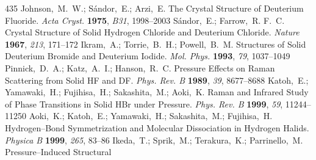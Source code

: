 \documentclass[12pt,letterpaper,oneside]{article}
\begin{document}
\begin{mcitethebibliography}{435}
\EndOfBibitem
{}
Johnson,~M.~W.; S{\'a}ndor,~E.; Arzi,~E. The Crystal Structure of Deuterium
  Fluoride. \emph{Acta Cryst.} \textbf{1975}, \emph{B31}, 1998--2003\relax
\mciteBstWouldAddEndPuncttrue
\mciteSetBstMidEndSepPunct{\mcitedefaultmidpunct}
{\mcitedefaultendpunct}{\mcitedefaultseppunct}\relax
\EndOfBibitem
{}
S{\'a}ndor,~E.; Farrow,~R. F.~C. Crystal Structure of Solid Hydrogen Chloride
  and Deuterium Chloride. \emph{Nature} \textbf{1967}, \emph{213},
  171--172\relax
\mciteBstWouldAddEndPuncttrue
\mciteSetBstMidEndSepPunct{\mcitedefaultmidpunct}
{\mcitedefaultendpunct}{\mcitedefaultseppunct}\relax
\EndOfBibitem
{}
Ikram,~A.; Torrie,~B.~H.; Powell,~B.~M. Structures of Solid Deuterium Bromide
  and Deuterium Iodide. \emph{Mol. Phys.} \textbf{1993}, \emph{79},
  1037--1049\relax
\mciteBstWouldAddEndPuncttrue
\mciteSetBstMidEndSepPunct{\mcitedefaultmidpunct}
{\mcitedefaultendpunct}{\mcitedefaultseppunct}\relax
\EndOfBibitem
{}
Pinnick,~D.~A.; Katz,~A.~I.; Hanson,~R.~C. Pressure Effects on Raman Scattering
  from Solid HF and DF. \emph{Phys. Rev. B} \textbf{1989}, \emph{39},
  8677--8688\relax
\mciteBstWouldAddEndPuncttrue
\mciteSetBstMidEndSepPunct{\mcitedefaultmidpunct}
{\mcitedefaultendpunct}{\mcitedefaultseppunct}\relax
\EndOfBibitem
{}
Katoh,~E.; Yamawaki,~H.; Fujihisa,~H.; Sakashita,~M.; Aoki,~K. Raman and
  Infrared Study of Phase Transitions in Solid HBr under Pressure. \emph{Phys.
  Rev. B} \textbf{1999}, \emph{59}, 11244--11250\relax
\mciteBstWouldAddEndPuncttrue
\mciteSetBstMidEndSepPunct{\mcitedefaultmidpunct}
{\mcitedefaultendpunct}{\mcitedefaultseppunct}\relax
\EndOfBibitem
{}
Aoki,~K.; Katoh,~E.; Yamawaki,~H.; Sakashita,~M.; Fujihisa,~H. Hydrogen--Bond
  Symmetrization and Molecular Dissociation in Hydrogen Halids. \emph{Physica
  B} \textbf{1999}, \emph{265}, 83--86\relax
\mciteBstWouldAddEndPuncttrue
\mciteSetBstMidEndSepPunct{\mcitedefaultmidpunct}
{\mcitedefaultendpunct}{\mcitedefaultseppunct}\relax
\EndOfBibitem
{}
Ikeda,~T.; Sprik,~M.; Terakura,~K.; Parrinello,~M. Pressure--Induced Structural

\end{mcitethebibliography}
\end{document}
